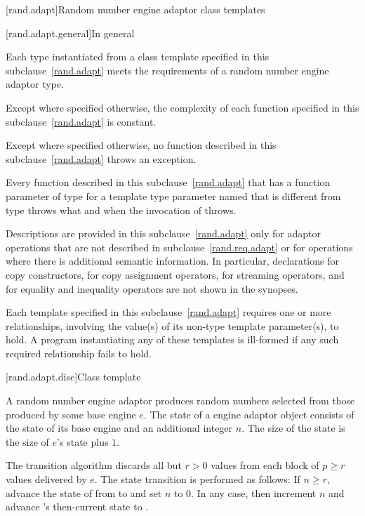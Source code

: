 [rand.adapt]{Random number engine adaptor class templates}

[rand.adapt.general]{In general}

\pnum
Each type instantiated
from a class template specified in this subclause~\ref{rand.adapt}
meets the requirements
of a random number engine adaptor type.

\pnum
Except where specified otherwise,
the complexity of each function
specified in this subclause~\ref{rand.adapt}
is constant.

\pnum
Except where specified otherwise,
no function described in this subclause~\ref{rand.adapt}
throws an exception.

\pnum
Every function described in this subclause~\ref{rand.adapt}
that has a function parameter  of type 
for a template type parameter named 
that is different from type 
throws what and when the invocation of  throws.

\pnum
Descriptions are provided in this subclause~\ref{rand.adapt}
only for adaptor operations
that are not described in subclause~\ref{rand.req.adapt}
or for operations where there is additional semantic information.
In particular,
declarations for copy constructors,
for copy assignment operators,
for streaming operators,
and for equality and inequality operators
are not shown in the synopses.

\pnum
Each template specified in this subclause~\ref{rand.adapt}
requires one or more relationships,
involving the value(s) of its non-type template parameter(s), to hold.
A program instantiating any of these templates
is ill-formed
if any such required relationship fails to hold.


[rand.adapt.disc]{Class template }%
%

\pnum
A  random number engine adaptor
produces random numbers
selected from those produced by some base engine $e$.
The state 
of a  engine adaptor object 
consists of the state  of its base engine 
and an additional integer $n$.
The size of the state is
 the size of $e$'s state plus $1$.

\pnum
The transition algorithm
discards all but $r > 0$ values
from each block of $p \geq r$ values delivered by $e$.
The state transition is performed as follows:
If $n \geq r$,
 advance the state of  from  to 
 and set $n$ to $0$.
In any case,
 then increment $n$
 and advance 's then-current state 
 to .

